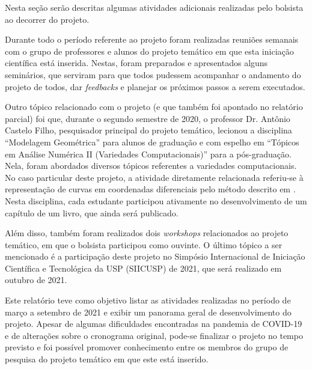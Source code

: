 Nesta seção serão descritas algumas atividades adicionais realizadas pelo bolsista ao decorrer do projeto.

Durante todo o período referente ao projeto foram realizadas reuniões semanais com o grupo de professores e alunos do projeto temático em que esta iniciação científica está inserida. Nestas, foram preparados e apresentados alguns seminários, que serviram para que todos pudessem acompanhar o andamento do projeto de todos, dar \textit{feedbacks} e planejar os próximos passos a serem executados.

Outro tópico relacionado com o projeto (e que também foi apontado no relatório parcial) foi que, durante o segundo semestre de 2020, o professor Dr. Antônio Castelo Filho, pesquisador principal do projeto temático, lecionou a disciplina ``Modelagem Geométrica'' para alunos de graduação e com espelho em ``Tópicos em Análise Numérica II (Variedades Computacionais)'' para a pós-graduação. Nela, foram abordados diversos tópicos referentes a variedades computacionais. No caso particular deste projeto, a atividade diretamente relacionada referiu-se à representação de curvas em coordenadas diferenciais pelo método descrito em . Nesta disciplina, cada estudante participou ativamente no desenvolvimento de um capítulo de um livro, que ainda será publicado.

Além disso, também foram realizados dois \textit{workshops} relacionados ao projeto temático, em que o bolsista participou como ouvinte. O último tópico a ser mencionado é a participação deste projeto no Simpósio Internacional de Iniciação Científica e Tecnológica da USP (SIICUSP) de 2021, que será realizado em outubro de 2021.

Este relatório teve como objetivo listar as atividades realizadas no período de março a setembro de 2021 e exibir um panorama geral de desenvolvimento do projeto. Apesar de algumas dificuldades encontradas na pandemia de COVID-19 e de alterações sobre o cronograma original, pode-se finalizar o projeto no tempo previsto e foi possível promover conhecimento entre os membros do grupo de pesquisa do projeto temático em que este está inserido.